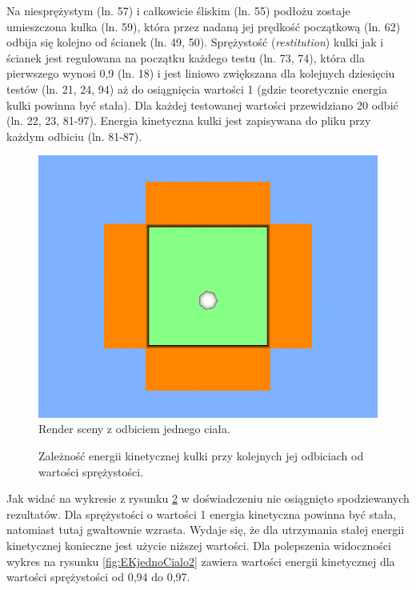 
\newpage
Na niesprężystym (ln. 57) i całkowicie śliskim (ln. 55) podłożu zostaje
umieszczona kulka (ln. 59), która przez nadaną jej prędkość początkową (ln. 62)
odbija się kolejno od ścianek (ln. 49, 50). Sprężystość (\emph{restitution})
kulki jak i ścianek jest regulowana na początku każdego testu (ln. 73, 74),
która dla pierwszego wynosi 0,9 (ln. 18) i jest liniowo zwiększana dla kolejnych
dziesięciu testów (ln. 21, 24, 94) aż do osiągnięcia wartości 1 (gdzie
teoretycznie energia kulki powinna być stała).
Dla każdej testowanej wartości przewidziano 20 odbić (ln. 22, 23, 81-97).
Energia kinetyczna kulki jest zapisywana do pliku przy każdym odbiciu (ln.
81-87).

\begin{figure}[h]
\centering
\includegraphics[scale = 0.5]{./img/SimpleSnookerScene.png}
\caption{Render sceny z odbiciem jednego ciała.}
\label{fig:render1}
\end{figure}

\begin{figure}[h]

\caption{Zależność energii kinetycznej kulki przy kolejnych jej odbiciach od wartości
sprężystości.}
\label{fig:EKjednoCialo}
\end{figure}

Jak widać na wykresie z rysunku \ref{fig:EKjednoCialo} w doświadczeniu nie
osiągnięto spodziewanych rezultatów. Dla sprężystości o wartości 1 energia
kinetyczna powinna być stała, natomiast tutaj gwałtownie wzrasta. Wydaje się,
że dla utrzymania stałej energii kinetycznej konieczne jest użycie niższej
wartości. Dla polepszenia widoczności wykres na rysunku
\ref{fig:EKjednoCialo2} zawiera wartości energii kinetycznej dla wartości
sprężystości od 0,94 do 0,97.

